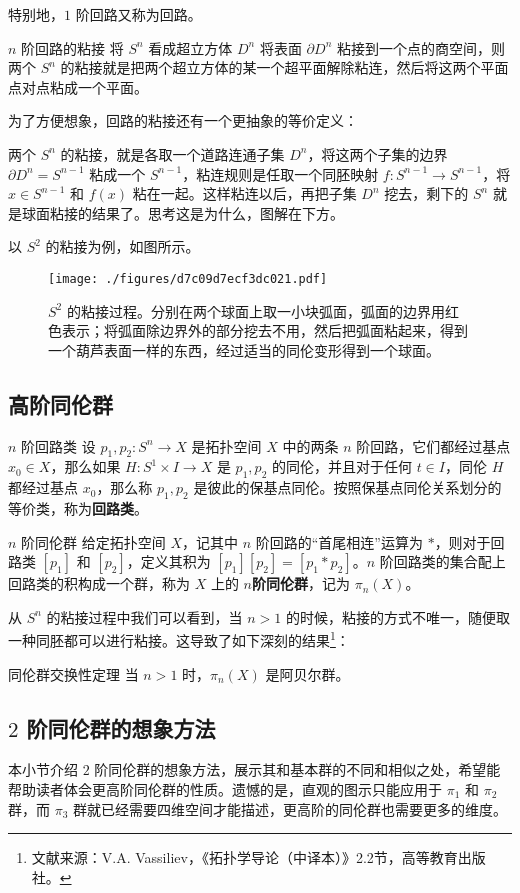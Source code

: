 特别地，$1$ 阶回路又称为回路。

\begin{definition}{$n$ 阶回路的粘接}
将 $S^n$ 看成超立方体 $D^n$ 将表面 $\partial D^n$ 粘接到一个点的商空间，则两个 $S^n$ 的粘接就是把两个超立方体的某一个超平面解除粘连，然后将这两个平面点对点粘成一个平面。
\end{definition}

为了方便想象，回路的粘接还有一个更抽象的等价定义：

\begin{exercise}{}
两个 $S^n$ 的粘接，就是各取一个道路连通子集 $D^n$，将这两个子集的边界 $\partial D^n=S^{n-1}$ 粘成一个 $S^{n-1}$，粘连规则是任取一个同胚映射 $f:S^{n-1}\rightarrow S^{n-1}$，将 $x\in S^{n-1}$ 和 $f(x)$ 粘在一起。这样粘连以后，再把子集 $D^n$ 挖去，剩下的 $S^n$ 就是球面粘接的结果了。思考这是为什么，图解在下方。
\end{exercise}

以 $S^2$ 的粘接为例，如图所示。

\begin{figure}[ht]
\centering
\texttt{[image: ./figures/d7c09d7ecf3dc021.pdf]}
\caption{$S^2$ 的粘接过程。分别在两个球面上取一小块弧面，弧面的边界用红色表示；将弧面除边界外的部分挖去不用，然后把弧面粘起来，得到一个葫芦表面一样的东西，经过适当的同伦变形得到一个球面。} \label{fig_HomT4_4}
\end{figure}

\subsection{高阶同伦群}

\begin{definition}{$n$ 阶回路类}
设 $p_1, p_2:S^n\rightarrow X$ 是拓扑空间 $X$ 中的两条 $n$ 阶回路，它们都经过基点 $x_0\in X$，那么如果 $H:S^1\times I\rightarrow X$ 是 $p_1, p_2$ 的同伦，并且对于任何 $t\in I$，同伦 $H$ 都经过基点 $x_0$，那么称 $p_1, p_2$ 是彼此的保基点同伦。按照保基点同伦关系划分的等价类，称为\textbf{回路类}。
\end{definition}

\begin{definition}{$n$ 阶同伦群}
给定拓扑空间 $X$，记其中 $n$ 阶回路的“首尾相连”运算为 $*$，则对于回路类 $[p_1]$ 和 $[p_2]$，定义其积为 $[p_1][p_2]=[p_1*p_2]$。$n$ 阶回路类的集合配上回路类的积构成一个群，称为 $X$ 上的 $n$\textbf{阶同伦群}，记为 $\pi_n(X)$。
\end{definition}

从 $S^n$ 的粘接过程中我们可以看到，当 $n>1$ 的时候，粘接的方式不唯一，随便取一种同胚都可以进行粘接。这导致了如下深刻的结果\footnote{文献来源：V.A. Vassiliev，《拓扑学导论（中译本）》2.2节，高等教育出版社。}：

\begin{theorem}{同伦群交换性定理}
当 $n>1$ 时，$\pi_n(X)$ 是阿贝尔群。
\end{theorem}

\subsection{$2$ 阶同伦群的想象方法}

本小节介绍 $2$ 阶同伦群的想象方法，展示其和基本群的不同和相似之处，希望能帮助读者体会更高阶同伦群的性质。遗憾的是，直观的图示只能应用于 $\pi_1$ 和 $\pi_2$ 群，而 $\pi_3$ 群就已经需要四维空间才能描述，更高阶的同伦群也需要更多的维度。


